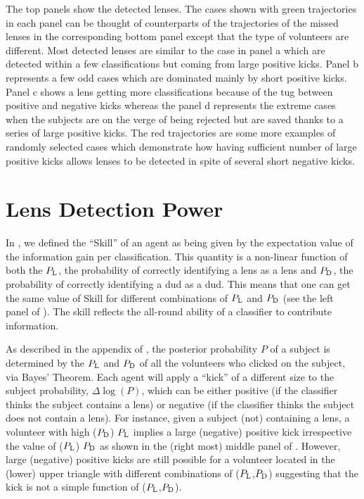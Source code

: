 \documentclass[useAMS,usenatbib,a4paper]{mn2e}
\begin{document}
The top panels show the detected lenses. The cases shown with green trajectories
in each panel can be thought of counterparts of the trajectories of the missed
lenses in the corresponding bottom panel except that the type of volunteers are
different. Most detected lenses are similar to the case in panel a which are
detected within a few classifications but coming from large positive kicks.
Panel b represents a few odd cases which are dominated mainly by short positive
kicks. Panel c shows a lens getting more classifications because of the tug
between positive and negative kicks whereas the panel d represents the extreme
cases when the subjects are on the verge of being rejected but are saved thanks
to a series of large positive kicks. The red trajectories are some more
examples of randomly selected cases which demonstrate how having sufficient
number of large positive kicks allows lenses to be detected in spite of several
short negative kicks.

\section{Lens Detection Power}
\label{appendix:power}

In \PaperOne, we defined the ``Skill'' of an agent as being given by the
expectation value of the information gain per classification. This
quantity is a non-linear function of both the $P_{\rm L}$, the
probability of correctly identifying a lens as a lens and $P_{\rm D}$,
the probability of correctly identifying a dud as a dud. This means that
one can get the same value of Skill for different combinations of
$P_{\rm L}$ and $P_{\rm D}$ (see the left panel of
). The skill reflects the all-round ability of a
classifier to contribute information.

As described in the appendix of \PaperOne, the posterior probability $P$
of a subject is determined by the $P_{\rm L}$ and $P_{\rm D}$ of all the
volunteers who clicked on the subject, via Bayes' Theorem. Each agent
will apply a ``kick'' of a different size to the subject probability,
$\Delta\log(P)$, which can be either positive (if the classifier thinks
the subject contains a lens) or negative (if the classifier thinks the
subject does not contain a lens). For instance, given a subject
(not) containing a lens, a volunteer with high ($P_{\rm D}$) $P_{\rm L}$
implies a large (negative) positive kick irrespective the value of
($P_{\rm L}$) $P_{\rm D}$ as shown in the (right most) middle panel of
. However, large (negative) positive kicks are
still possible for a volunteer located in the (lower) upper triangle
with different combinations of ($P_{\rm L}$,$P_{\rm D}$) suggesting that
the kick is not a simple function of ($P_{\rm L}$,$P_{\rm D}$).
\end{document}
